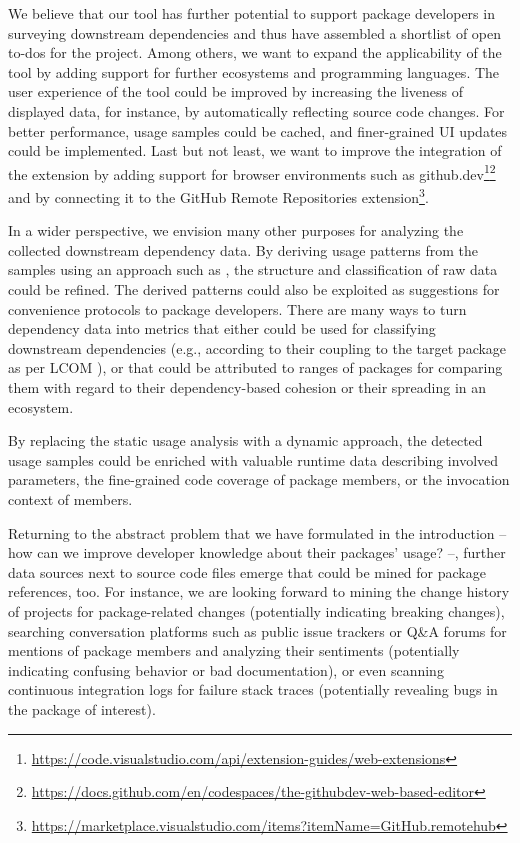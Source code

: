 We believe that our tool has further potential to support package developers in surveying downstream dependencies and thus have assembled a shortlist of open to-dos for the project.
Among others, we want to expand the applicability of the tool by adding support for further ecosystems and programming languages.
The user experience of the tool could be improved by increasing the liveness of displayed data, for instance, by automatically reflecting source code changes.
For better performance, usage samples could be cached, and finer-grained UI updates could be implemented.
Last but not least, we want to improve the integration of the extension by adding support for browser environments such as github.dev\footnote{\url{https://code.visualstudio.com/api/extension-guides/web-extensions}}\footnoteseparator\footnote{\url{https://docs.github.com/en/codespaces/the-githubdev-web-based-editor}} and by connecting it to the GitHub Remote Repositories extension\footnote{\url{https://marketplace.visualstudio.com/items?itemName=GitHub.remotehub}}.

In a wider perspective, we envision many other purposes for analyzing the collected downstream dependency data.
By deriving usage patterns from the samples using an approach such as \cite{zhong2009mapo}, the structure and classification of raw data could be refined.
The derived patterns could also be exploited as suggestions for convenience protocols to package developers.
There are many ways to turn dependency data into metrics that either could be used for classifying downstream dependencies (e.g., according to their coupling to the target package as per LCOM \citep{chidamber1994metrics}), or that could be attributed to ranges of packages for comparing them with regard to their dependency-based cohesion or their spreading in an ecosystem.

By replacing the static usage analysis with a dynamic approach, the detected usage samples could be enriched with valuable runtime data describing involved parameters, the fine-grained code coverage of package members, or the invocation context of members.

Returning to the abstract problem that we have formulated in the introduction -- how can we improve developer knowledge about their packages' usage? --, further data sources next to source code files emerge that could be mined for package references, too.
For instance, we are looking forward to mining the change history of projects for package-related changes (potentially indicating breaking changes), searching conversation platforms such as public issue trackers or Q\&A forums for mentions of package members and analyzing their sentiments (potentially indicating confusing behavior or bad documentation), or even scanning continuous integration logs for failure stack traces (potentially revealing bugs in the package of interest).
